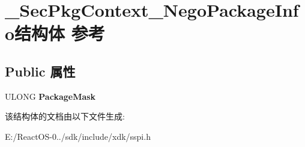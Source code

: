 \hypertarget{struct___sec_pkg_context___nego_package_info}{}\section{\+\_\+\+Sec\+Pkg\+Context\+\_\+\+Nego\+Package\+Info结构体 参考}
\label{struct___sec_pkg_context___nego_package_info}
\subsection*{Public 属性}
\begin{DoxyCompactItemize}
\item 
\mbox{\label{struct___sec_pkg_context___nego_package_info_a26c4d9915c40f008e8265d88559dc2f4}} 
U\+L\+O\+NG {\bfseries Package\+Mask}
\end{DoxyCompactItemize}


该结构体的文档由以下文件生成\+:\begin{DoxyCompactItemize}
\item 
E\+:/\+React\+O\+S-\/0../sdk/include/xdk/sspi.\+h\end{DoxyCompactItemize}
